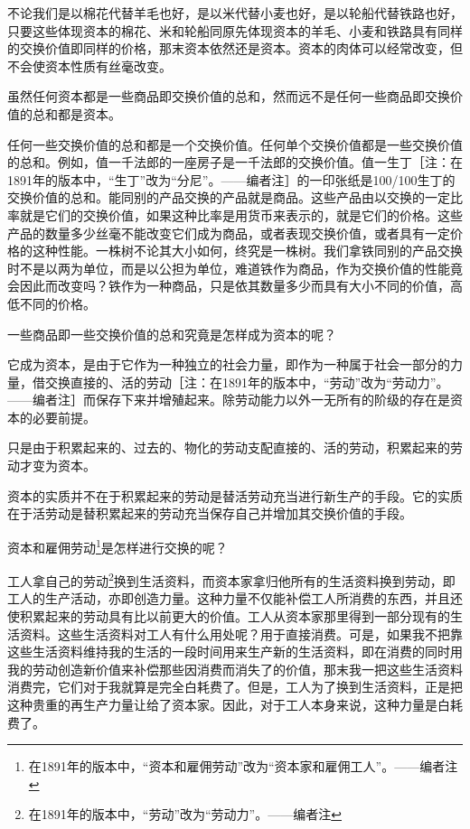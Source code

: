\documentclass[a4paper,twoside,12pt]{ctexart}
\begin{document}
不论我们是以棉花代替羊毛也好，是以米代替小麦也好，是以轮船代替铁路也好，只要这些体现资本的棉花、米和轮船同原先体现资本的羊毛、小麦和铁路具有同样的交换价值即同样的价格，那末资本依然还是资本。资本的肉体可以经常改变，但不会使资本性质有丝毫改变。

虽然任何资本都是一些商品即交换价值的总和，然而远不是任何一些商品即交换价值的总和都是资本。

任何一些交换价值的总和都是一个交换价值。任何单个交换价值都是一些交换价值的总和。例如，值一千法郎的一座房子是一千法郎的交换价值。值一生丁［注：在1891年的版本中，“生丁”改为“分尼”。——编者注］的一印张纸是100/100生丁的交换价值的总和。能同别的产品交换的产品就是商品。这些产品由以交换的一定比率就是它们的交换价值，如果这种比率是用货币来表示的，就是它们的价格。这些产品的数量多少丝毫不能改变它们成为商品，或者表现交换价值，或者具有一定价格的这种性能。一株树不论其大小如何，终究是一株树。我们拿铁同别的产品交换时不是以两为单位，而是以公担为单位，难道铁作为商品，作为交换价值的性能竟会因此而改变吗？铁作为一种商品，只是依其数量多少而具有大小不同的价值，高低不同的价格。

一些商品即一些交换价值的总和究竟是怎样成为资本的呢？

它成为资本，是由于它作为一种独立的社会力量，即作为一种属于社会一部分的力量，借交换直接的、活的劳动［注：在1891年的版本中，“劳动”改为“劳动力”。——编者注］而保存下来并增殖起来。除劳动能力以外一无所有的阶级的存在是资本的必要前提。

只是由于积累起来的、过去的、物化的劳动支配直接的、活的劳动，积累起来的劳动才变为资本。

资本的实质并不在于积累起来的劳动是替活劳动充当进行新生产的手段。它的实质在于活劳动是替积累起来的劳动充当保存自己并增加其交换价值的手段。

资本和雇佣劳动\footnote{在1891年的版本中，“资本和雇佣劳动”改为“资本家和雇佣工人”。——编者注}是怎样进行交换的呢？

工人拿自己的劳动\footnote{在1891年的版本中，“劳动”改为“劳动力”。——编者注}换到生活资料，而资本家拿归他所有的生活资料换到劳动，即工人的生产活动，亦即创造力量。这种力量不仅能补偿工人所消费的东西，并且还使积累起来的劳动具有比以前更大的价值。工人从资本家那里得到一部分现有的生活资料。这些生活资料对工人有什么用处呢？用于直接消费。可是，如果我不把靠这些生活资料维持我的生活的一段时间用来生产新的生活资料，即在消费的同时用我的劳动创造新价值来补偿那些因消费而消失了的价值，那末我一把这些生活资料消费完，它们对于我就算是完全白耗费了。但是，工人为了换到生活资料，正是把这种贵重的再生产力量让给了资本家。因此，对于工人本身来说，这种力量是白耗费了。
\end{document}
